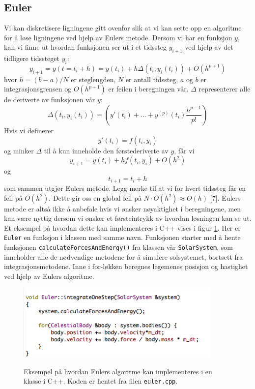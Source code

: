 \documentclass[11pt,a4paper]{article}
\begin{document}
\subsection{Euler}
Vi kan diskretisere ligningene gitt ovenfor slik at vi kan sette opp en algoritme for å løse ligningene ved hjelp av Eulers metode. Dersom vi har en funksjon $y$, kan vi finne ut hvordan funksjonen ser ut i et tidssteg $y_{i+1}$ ved hjelp av det tidligere tidssteget $y_i$:
\[y_{i+1} = y(t= t_i + h) = y(t_i) + h\Delta(t_i, y_i(t_i)) + O(h^{p+1}) \]
hvor $h = (b - a)/N$ er steglengden, $N$ er antall tidssteg, $a$ og $b$ er integrasjonsgrensen og $O(h^{p+1})$ er feilen i beregningen vår. $\Delta$ representerer alle de deriverte av funksjonen vår $y$:
\[\Delta(t_i, y_i(t_i)) = (y'(t_i) + ... + y^{(p)}(t_i)\frac{h^{p-1}}{p!} )  \]
Hvis vi definerer
\[y'(t_i) = f(t_i, y_i) \]
og minker $\Delta$ til å kun inneholde den førstederiverte av $y$, får vi
\[y_{i+1} = y(t_i) + hf(t_i,y_i) + O(h^2)  \]
og 
\[t_{i+1} = t_i + h \]
som sammen utgjør Eulers metode. Legg merke til at vi for hvert tidssteg får en feil på $O(h^2)$. Dette gir oss en global feil på $N\cdot O(h^2) \approx O(h)$  [7]. Eulers metode er altså ikke å anbefale hvis vi ønsker nøyaktighet i beregningene, men kan være nyttig dersom vi ønsker et førsteintrykk av hvordan løsningen kan se ut. \\

Et eksempel på hvordan dette kan implementeres i C++ vises i figur \ref{euler}. Her er \texttt{Euler} en funksjon i klassen med samme navn. Funksjonen starter med å hente funksjonen \texttt{calculateForcesAndEnergy()} fra klassen vår \texttt{SolarSystem}, som inneholder alle de nødvendige metodene for å simulere solsystemet, bortsett fra integrasjonsmetodene. Inne i for-løkken beregnes legemenes posisjon og hastighet ved hjelp av Eulers algoritme.

\FloatBarrier
\begin{figure}[!ht]
\begin{center}
  \includegraphics[width = 100mm]{euler.png}\\
  \caption{Eksempel på hvordan Eulers algoritme kan implementeres i en klasse i C++. Koden er hentet fra filen \texttt{euler.cpp}.}   \label{euler}
  \end{center}
  \end{figure}
\FloatBarrier
\end{document}
